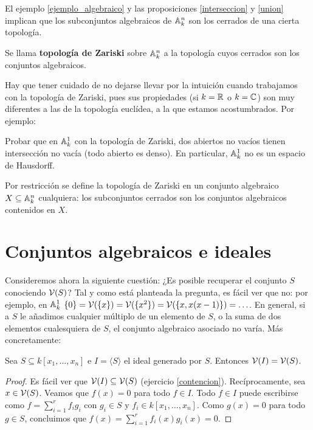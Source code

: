 \documentclass[ACGA.tex]{subfiles}
\begin{document}
El ejemplo \ref{ejemplo_algebraico} y las proposiciones \ref{interseccion} y \ref{union} implican que los subconjuntos algebraicos de $\mathbb{A}^n_k$ son los cerrados de una cierta topología.

\begin{defi}
 Se llama {\bf topología de Zariski} sobre $\mathbb{A}^n_k$ a la topología cuyos cerrados son los conjuntos algebraicos.
\end{defi}

Hay que tener cuidado de no dejarse llevar por la intuición cuando trabajamos con la topología de Zariski, pues sus propiedades (si $k=\mathbb{R}$ o $k=\mathbb{C}$) son muy diferentes a las de la topología euclídea, a la que estamos acostumbrados. Por ejemplo:

\begin{ejer} Probar que en $\mathbb{A}^1_k$ con la topología de Zariski, dos abiertos no vacíos tienen intersección no vacía (todo abierto es denso). En particular, $\mathbb{A}^1_k$ no es un espacio de Hausdorff.
 
\end{ejer}

Por restricción se define la topología de Zariski en un conjunto algebraico $X\subseteq\mathbb{A}^n_k$ cualquiera: los subconjuntos cerrados son los conjuntos algebraicos contenidos en $X$.

\section{Conjuntos algebraicos e ideales}

Consideremos ahora la siguiente cuestión: ¿Es posible recuperar el conjunto $S$ conociendo $\mathcal{V}(S)$? Tal y como está planteada la pregunta, es fácil ver que no: por ejemplo, en $\mathbb{A}^1_k$ $\{0\}=\mathcal{V}(\{x\})=\mathcal{V}(\{x^2\})=\mathcal{V}(\{x,x(x-1)\})=\ldots$. En general, si a $S$ le añadimos cualquier múltiplo de un elemento de $S$, o la suma de dos elementos cualesquiera de $S$, el conjunto algebraico asociado no varía. Más concretamente:

\begin{prop} Sea $S\subseteq k[x_1,\ldots,x_n]$ e $I=\langle S\rangle$ el ideal generado por $S$. Entonces $\mathcal{V}(I)=\mathcal{V}(S)$.
 
\end{prop}

\begin{proof}
 Es fácil ver que $\mathcal{V}(I)\subseteq \mathcal{V}(S)$ (ejercicio \ref{contencion}). Recíprocamente, sea $x\in \mathcal{V}(S)$. Veamos que $f(x)=0$ para todo $f\in I$. Todo $f\in I$ puede escribirse como $f=\sum_{i=1}^r f_i g_i$ con $g_i\in S$ y $f_i\in k[x_1,\ldots,x_n]$. Como $g(x)=0$ para todo $g\in S$, concluimos que $f(x)=\sum_{i=1}^r f_i(x)g_i(x)=0$.
\end{proof}
\end{document}
